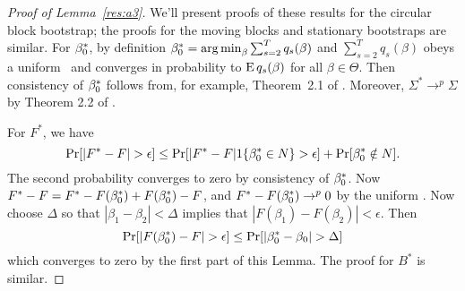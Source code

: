 \documentclass[12pt,fleqn]{article}
\begin{document}
\begin{proof}[Proof of Lemma~\ref{res:a3}]
  We'll present proofs of these results for the circular block
  bootstrap; the proofs for the moving blocks and stationary
  bootstraps are similar. For $\beta_0^*$, by definition $\beta_0^* =
  \operatorname*{arg\,min}_\beta \sum_{s=2}^T q_s(\beta)$ and $\sum_{s=2}^T q_s(\beta)$
  obeys a uniform \lln\ and converges in probability to $\operatorname{E}
  q_s(\beta)$ for all $\beta \in \Theta$. Then consistency of
  $\beta_0^*$ follows from, for example, Theorem~2.1 of \cite{NeM:94}.
  Moreover, $\Sigma^* \to^p \Sigma$ by Theorem 2.2 of
  \citet{JoD:00}.

  For $F^*$, we have
  \begin{equation*}
    \operatorname{Pr}[|F^* - F| > \epsilon] \leq
    \operatorname{Pr}[|F^* - F| 1\{\beta_0^* \in N\} > \epsilon] + \operatorname{Pr}[\beta_0^* \notin N].
  \end{equation*}
  The second probability converges to zero by consistency of
  $\beta_0^*$.  Now $F^* - F = F^* - F(\beta_0^*) + F(\beta_0^*) - F$,
  and $F^* - F(\beta_0^*) \to^p 0$ by the uniform \lln. Now choose
  $\Delta$ so that $|\beta_1 - \beta_2| < \Delta$ implies that
  $|F(\beta_1) - F(\beta_2) | < \epsilon$. Then
  \begin{equation*}
     \operatorname{Pr}[|F(\beta_0^*) - F | > \epsilon] \leq \operatorname{Pr}[|\beta_0^* - \beta_0| > \Delta]
  \end{equation*}
  which converges to zero by the first part of this Lemma. The proof
  for $B^*$ is similar.
\end{proof}


\end{document}
